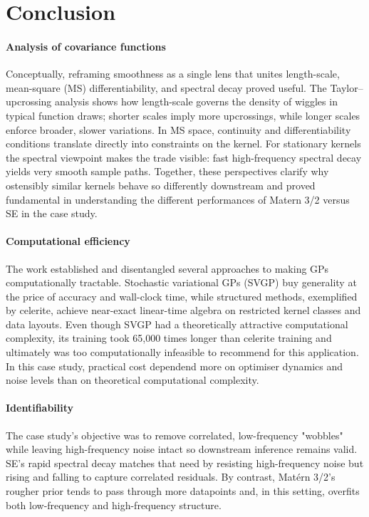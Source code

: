 \section{Conclusion}

\paragraph{Analysis of covariance functions}
Conceptually, reframing smoothness as a single lens that unites length-scale, mean-square (MS) differentiability, and spectral decay proved useful. The Taylor–upcrossing analysis shows how length-scale governs the density of wiggles in typical function draws; shorter scales imply more upcrossings, while longer scales enforce broader, slower variations. In MS space, continuity and differentiability conditions translate directly into constraints on the kernel. For stationary kernels the spectral viewpoint makes the trade visible: fast high-frequency spectral decay yields very smooth sample paths. Together, these perspectives clarify why ostensibly similar kernels behave so differently downstream and proved fundamental in understanding the different performances of Matern 3/2 versus SE in the case study.

\paragraph{Computational efficiency}
The work established and disentangled several approaches to making GPs computationally tractable. Stochastic variational GPs (SVGP) buy generality at the price of accuracy and wall-clock time, while structured methods, exemplified by celerite, achieve near-exact linear-time algebra on restricted kernel classes and data layouts. Even though SVGP had a theoretically attractive computational complexity, its training took 65,000 times longer than celerite training and ultimately was too computationally infeasible to recommend for this application. In this case study, practical cost dependend more on optimiser dynamics and noise levels than on theoretical computational complexity. 

\paragraph{Identifiability}
The case study's objective was to remove correlated, low-frequency "wobbles" while leaving high-frequency noise intact so downstream inference remains valid. SE's rapid spectral decay matches that need by resisting high-frequency noise but rising and falling to capture correlated residuals. By contrast, Matérn 3/2's rougher prior tends to pass through more datapoints and, in this setting, overfits both low-frequency and high-frequency structure. 
